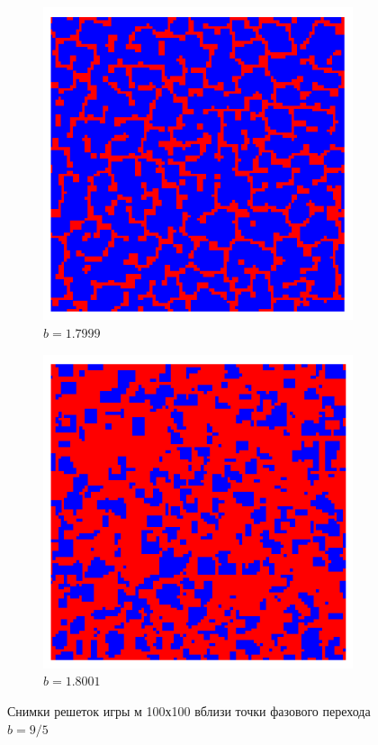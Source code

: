 \documentclass[12pt,a4paper]{article}
\begin{document}
\begin{figure}[H]
		\begin{subfigure}{.5\textwidth}
			\includegraphics[width=1\linewidth]{g1.7999.png}
			\caption{$b=1.7999$}
			\label{grid_left}			
		\end{subfigure}%
		\begin{subfigure}{.5\textwidth}
			\includegraphics[width=1\linewidth]{g1.8001.png}
			\caption{$b=1.8001$}
			\label{grid_right}			
		\end{subfigure}%
		\caption{Снимки решеток игры м 100х100 вблизи точки фазового перехода $b=9/5$}
		\label{fig_exmpl}
	\end{figure}
		
\end{document}
